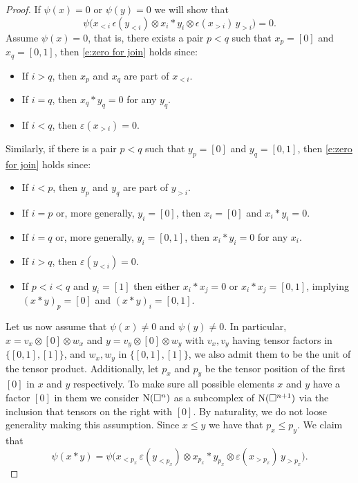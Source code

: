 \begin{proof}
	If $\psi(x) = 0$ or $\psi(y) = 0$ we will show that
	\begin{equation} \label{e:zero for join}
	\psi \big( x_{<i}\, \epsilon(y_{<i}) \otimes x_i \ast y_i \otimes \epsilon(x_{>i}) \, y_{>i} \big) = 0.
	\end{equation}
	Assume $\psi(x) = 0$, that is, there exists a pair $p < q$ such that $x_p = [0]$ and $x_q = [0,1]$, then \eqref{e:zero for join} holds since:
	\begin{itemize}
		\item If $i > q$, then $x_p$ and $x_q$ are part of $x_{<i}$.
		\item If $i = q$, then $x_q \ast y_q = 0$ for any $y_q$.
		\item If $i < q$, then $\varepsilon(x_{>i}) = 0$.
	\end{itemize}
	Similarly, if there is a pair $p < q$ such that $y_p = [0]$ and $y_q = [0,1]$,  then \eqref{e:zero for join} holds since:
	\begin{itemize}
		\item If $i < p$, then $y_p$ and $y_q$ are part of $y_{>i}$.
		\item If $i = p$ or, more generally, $y_i = [0]$, then $x_i = [0]$ and $x_i \ast y_i = 0$.
		\item If $i = q$ or, more generally, $y_i = [0,1]$, then $x_i \ast y_i = 0$ for any $x_i$.
		\item If $i > q$, then $\varepsilon(y_{<i}) = 0$.
		\item If $p < i < q$ and $y_i = [1]$ then either $x_i \ast x_j = 0$ or $x_i \ast x_j = [0,1]$, implying $(x \ast y)_p = [0]$ and $(x \ast y)_i = [0,1]$.
	\end{itemize}
	Let us now assume that $\psi(x) \neq 0$ and $\psi(y) \neq 0$.
	In particular, $x = v_x \otimes [0] \otimes w_x$ and $y = v_y \otimes [0] \otimes w_y$ with $v_x, v_y$ having tensor factors in $\{[0,1], [1]\}$, and $w_x, w_y$ in $\{[0,1], [1]\}$, we also admit them to be the unit of the tensor product.
	Additionally, let $p_x$ and $p_y$ be the tensor position of the first $[0]$ in $x$ and $y$ respectively.
	To make sure all possible elements $x$ and $y$ have a factor $[0]$ in them we consider $\operatorname{N}(\square^n)$ as a subcomplex of $\operatorname{N}(\square^{n+1})$ via the inclusion that tensors on the right with $[0]$.
	By naturality, we do not loose generality making this assumption.
	Since $x \leq y$ we have that $p_x \leq p_y$.
	We claim that
	\begin{equation*}
	\psi(x \ast y) = \psi \big( x_{<p_x} \, \varepsilon(y_{<p_x}) \otimes x_{p_x} \ast y_{p_x} \otimes \varepsilon(x_{>p_x}) \, y_{>p_x} \big).

\end{equation*}
\end{proof}
